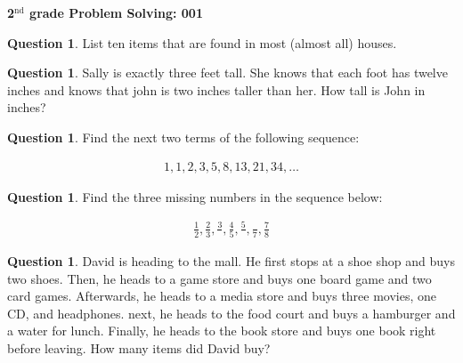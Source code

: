\documentclass[12pt]{article}
\theoremstyle{definition}
\newtheorem{question}[thm]{Question}
\begin{document}
	\begin{center}
	{\LARGE \textbf{2$^{\textrm{nd}}$ grade Problem Solving: 001}}\\
		\vspace{.6cm}
	\end{center}
	
\begin{question}
	List ten items that are found in most (almost all) houses.
\end{question}

\vspace{4cm}

\begin{question}
	Sally is exactly three feet tall. She knows that each foot has twelve inches and knows that john is two inches taller than her. How tall is John in inches?
\end{question}

\vspace{4cm}

\begin{question}
	Find the next two terms of the following sequence:
	\begin{large}
	\begin{align*}
	1,1,2,3,5,8,13,21, 34,\dots
	\end{align*}
	\end{large}
\end{question}

\vspace{3cm}

\begin{question}
	Find the three missing numbers in the sequence below:
	\begin{large}
	\begin{align*}
	\frac{1}{2}, \frac{2}{3}, \frac{3}{ }, \frac{4}{5}, \frac{5}{ }, \frac{ }{7}, \frac{7}{8}
	\end{align*}
	\end{large}
\end{question}

\newpage

\begin{question}
David is heading to the mall. He first stops at a shoe shop and buys two shoes. Then, he heads to a game store and buys one board game and two card games. Afterwards, he heads to a media store and buys three movies, one CD, and headphones. next, he heads to the food court and buys a hamburger and a water for lunch. Finally, he heads to the book store and buys one book right before leaving. How many items did David buy?
\end{question}
\end{document}
